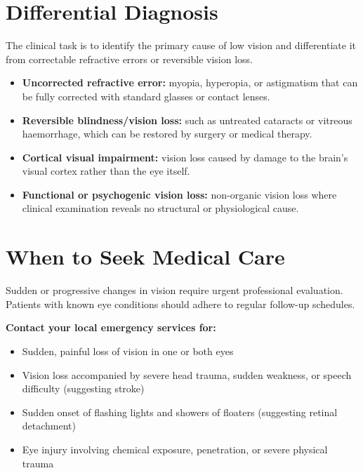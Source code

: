 \section*{Differential Diagnosis}
The clinical task is to identify the primary cause of low vision and differentiate it from correctable refractive errors or reversible vision loss.
\begin{itemize}
    \item \textbf{Uncorrected refractive error:} myopia, hyperopia, or astigmatism that can be fully corrected with standard glasses or contact lenses.
    \item \textbf{Reversible blindness/vision loss:} such as untreated cataracts or vitreous haemorrhage, which can be restored by surgery or medical therapy.
    \item \textbf{Cortical visual impairment:} vision loss caused by damage to the brain's visual cortex rather than the eye itself.
    \item \textbf{Functional or psychogenic vision loss:} non-organic vision loss where clinical examination reveals no structural or physiological cause.
\end{itemize}

\section*{When to Seek Medical Care}
Sudden or progressive changes in vision require urgent professional evaluation. Patients with known eye conditions should adhere to regular follow-up schedules.

\textbf{Contact your local emergency services for:}
\begin{itemize}
    \item Sudden, painful loss of vision in one or both eyes
    \item Vision loss accompanied by severe head trauma, sudden weakness, or speech difficulty (suggesting stroke)
    \item Sudden onset of flashing lights and showers of floaters (suggesting retinal detachment)
    \item Eye injury involving chemical exposure, penetration, or severe physical trauma
\end{itemize}


